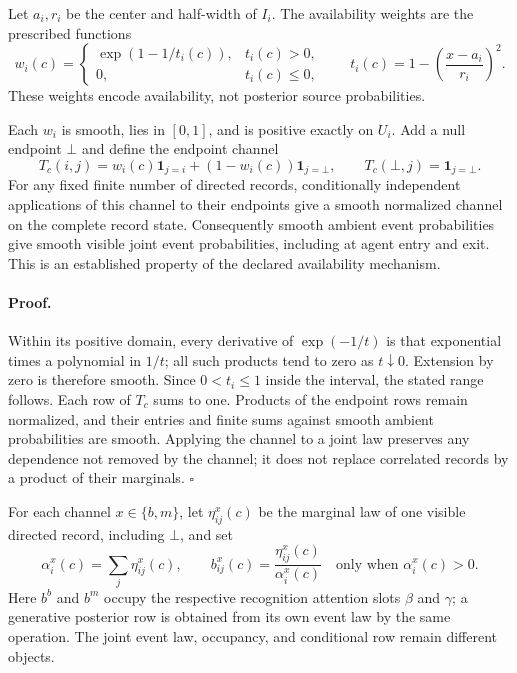 Let \(a_i,r_i\) be the center and half-width of \(I_i\). The availability
weights are the prescribed functions
\begin{equation}
 w_i(c)=
 \begin{cases}
 \exp(1-1/t_i(c)),&t_i(c)>0,\\
 0,&t_i(c)\leq0,
 \end{cases}
 \qquad t_i(c)=1-\left(\frac{x-a_i}{r_i}\right)^2.
\label{eq:rg-cover-bumps}
\end{equation}
These weights encode availability, not posterior source probabilities.

Each \(w_i\) is smooth, lies in \([0,1]\), and is positive exactly on
\(U_i\). Add a null endpoint \(\bot\) and define the endpoint channel
\begin{equation}
 T_c(i,j)=w_i(c)\mathbf1_{j=i}+(1-w_i(c))\mathbf1_{j=\bot},
 \qquad T_c(\bot,j)=\mathbf1_{j=\bot}.
\label{eq:rg-cover-availability-channel}
\end{equation}
For any fixed finite number of directed records, conditionally independent
applications of this channel to their endpoints give a smooth normalized
channel on the complete record state. Consequently smooth ambient event
probabilities give smooth visible joint event probabilities, including at
agent entry and exit. This is an established property of the declared
availability mechanism. 

\paragraph{Proof.}
Within its positive domain, every derivative of \(\exp(-1/t)\) is that
exponential times a polynomial in \(1/t\); all such products tend to zero
as \(t\downarrow0\). Extension by zero is therefore smooth. Since
\(0<t_i\leq1\) inside the interval, the stated range follows. Each row of
\(T_c\) sums to one. Products of the endpoint rows remain normalized,
and their entries and finite sums against smooth ambient probabilities are
smooth. Applying the channel to a joint law preserves any dependence not
removed by the channel; it does not replace correlated records by a product
of their marginals. \(\square\)

For each channel \(x\in\{b,m\}\), let \(\eta^x_{ij}(c)\) be the
marginal law of one visible directed record, including \(\bot\), and set
\begin{equation}
 \alpha_i^x(c)=\sum_j\eta^x_{ij}(c),\qquad
 b^x_{ij}(c)=\frac{\eta^x_{ij}(c)}{\alpha_i^x(c)}
 \quad\text{only when }\alpha_i^x(c)>0.
\label{eq:rg-cover-conditional-attention}
\end{equation}
Here \(b^b\) and \(b^m\) occupy the respective recognition attention
slots \(\beta\) and \(\gamma\); a generative posterior row is obtained
from its own event law by the same operation. The joint event law, occupancy,
and conditional row remain different objects. 


